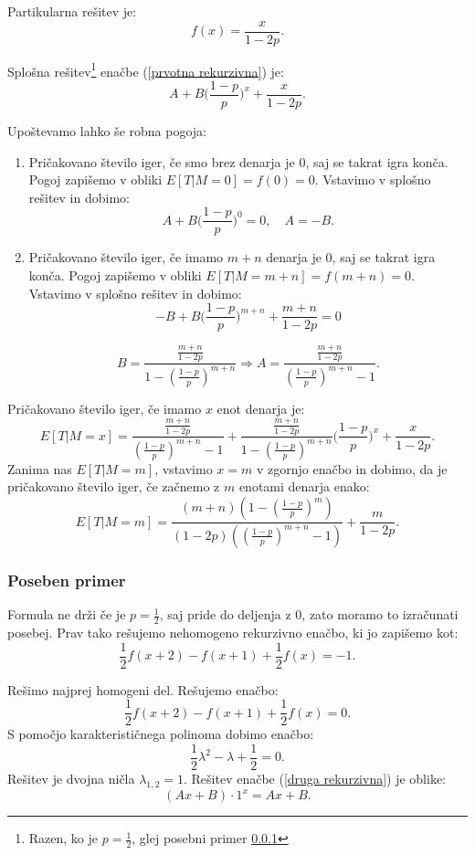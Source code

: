 \documentclass[12pt, a4paper]{article}
\begin{document}
Partikularna rešitev je: $$f(x)=\frac{x}{1-2p}.$$

Splošna rešitev\footnote{Razen, ko je $p=\frac{1}{2}$, glej posebni primer \ref{Posebni primer za 1/2} } enačbe (\ref{prvotna rekurzivna}) je: $$A + B\bigg( \frac{1-p}{p} \bigg )^x+\frac{x}{1-2p}.$$

Upoštevamo lahko še robna pogoja:
\begin{enumerate}
\item Pričakovano število iger, če smo brez denarja je 0, saj se takrat igra konča. Pogoj zapišemo v obliki $E[T|M= 0] = f(0) = 0$. Vstavimo v splošno rešitev in dobimo:
$$A + B\bigg( \frac{1-p}{p} \bigg )^0 = 0, \quad A = -B.$$
\item Pričakovano število iger, če imamo $m+n$ denarja je 0, saj se takrat igra konča. Pogoj zapišemo v obliki $E[T|M= m+n] = f(m+n) = 0$. Vstavimo v splošno rešitev in dobimo:
$$-B + B\bigg( \frac{1-p}{p} \bigg )^{m+n}+\frac{m+n}{1-2p}=0$$

$$B = \frac{\frac{m+n}{1-2p}}{1- \left(\frac{1-p}{p}\right)^{m+n}} \Rightarrow A = \frac{\frac{m+n}{1-2p}}{\left(\frac{1-p}{p}\right)^{m+n}-1}.$$
\end{enumerate}

Pričakovano število iger, če imamo $x$ enot denarja je: $$E[ T | M = x]= \frac{\frac{m+n}{1-2p}}{\left(\frac{1-p}{p}\right)^{m+n}-1} + \frac{\frac{m+n}{1-2p}}{1- \left(\frac{1-p}{p}\right)^{m+n}}\bigg( \frac{1-p}{p} \bigg )^x+\frac{x}{1-2p}.$$
 Zanima nas $E[T|M=m]$, vstavimo $x=m$ v zgornjo enačbo in dobimo, da je pričakovano število iger, če začnemo z $m$ enotami denarja enako: $$E[T|M=m]=\frac{(m+n) \left(1-\left(\frac{1-p}{p}\right)^m\right)}{(1-2 p)
   \left(\left(\frac{1-p}{p}\right)^{m+n}-1\right)}+\frac{m}{1-2 p}.$$

\subsubsection{Poseben primer}
\label{Posebni primer za 1/2}
Formula ne drži če je $p = \frac{1}{2}$, saj pride do deljenja z 0, zato moramo to izračunati posebej. Prav tako rešujemo nehomogeno rekurzivno enačbo, ki jo zapišemo kot: 
\begin{equation}
\label{druga rekurzivna}
\frac{1}{2}f(x+2)-f(x+1)+\frac{1}{2}f(x)=-1.
\end{equation}

Rešimo najprej homogeni del. Rešujemo enačbo: $$\frac{1}{2}f(x+2)-f(x+1)+\frac{1}{2}f(x)=0.$$ S pomočjo karakterističnega polinoma dobimo enačbo: 
\begin{equation}
\label{druga homogena}
\frac{1}{2}\lambda^2-\lambda+\frac{1}{2}=0.
\end{equation} 
Rešitev je dvojna ničla $\lambda_{1, 2}= 1$. Rešitev enačbe (\ref{druga rekurzivna}) je oblike: $$(Ax+B)\cdot 1^x=Ax+B.$$
\end{document}
